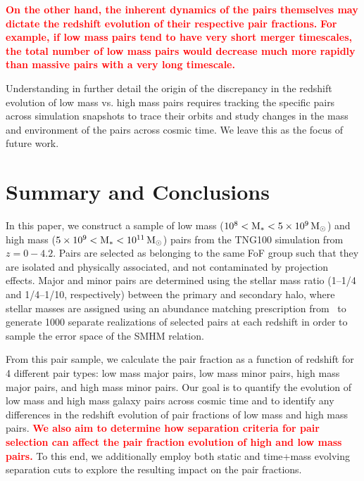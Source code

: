 \documentclass[linenumbers,twocolumn]{aastex631}
\newcommand{\add}[1]{\textcolor{red}{\textbf{#1}}}
\begin{document}
    \add{On the other hand, the inherent dynamics of the pairs themselves may dictate the redshift evolution of their respective pair fractions.}
    \add{For example, if low mass pairs tend to have very short merger timescales, the total number of low mass pairs would decrease much more rapidly than massive pairs with a very long timescale.}
    
    Understanding in further detail the origin of the discrepancy in the redshift evolution of low mass vs. high mass pairs requires tracking the specific pairs across simulation snapshots to trace their orbits and study changes in the mass and environment of the pairs across cosmic time.  
    We leave this as the focus of future work.

\section{Summary and Conclusions}\label{sec:summary}
In this paper, we construct a sample of low mass ($\rm 10^8<M_*<5\times10^9\,\mathrm{M}_\odot$) and high mass ($\rm 5\times10^9<M_*<10^{11}\,\mathrm{M}_\odot$) pairs from the TNG100 simulation from $z=0-4.2$. Pairs are selected as belonging to the same FoF group such that they are isolated and physically associated, and not contaminated by projection effects.
Major and minor pairs are determined using the stellar mass ratio (1--1/4 and 1/4--1/10, respectively) between the primary and secondary halo, where stellar masses are assigned using an abundance matching prescription from~\cite{Moster2013} to generate 1000 separate realizations of selected pairs at each redshift in order to sample the error space of the SMHM relation.

From this pair sample, we calculate the pair fraction as a function of redshift for 4 different pair types: low mass major pairs, low mass minor pairs, high mass major pairs, and high mass minor pairs. 
Our goal is to quantify the evolution of low mass and high mass galaxy pairs across cosmic time and to identify any differences in the redshift evolution of pair fractions of low mass and high mass pairs.
\add{We also aim to determine how separation criteria for pair selection can affect the pair fraction evolution of high and low mass pairs.}
To this end, we additionally employ both static and time+mass evolving separation cuts to explore the resulting impact on the pair fractions.
\end{document}
